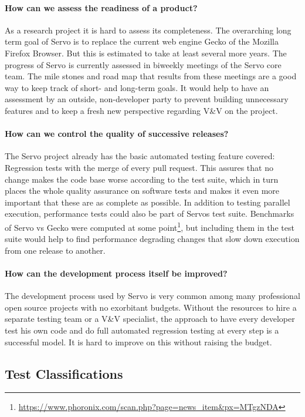 \documentclass{scrartcl}
\begin{document}
\paragraph{How can we assess the readiness of a product?}
As a research project it is hard to assess its completeness. The overarching long term goal of Servo is to replace the current web engine Gecko of the Mozilla Firefox Browser. But this is estimated to take at least several more years. The progress of Servo is currently assessed in biweekly meetings of the Servo core team. The mile stones and road map that results from these meetings are a good way to keep track of short- and long-term goals. It would help to have an assessment by an outside, non-developer party to prevent building unnecessary features and to keep a fresh new perspective regarding V\&V on the project.

\paragraph{How can we control the quality of successive releases?}
The Servo project already has the basic automated testing feature covered: Regression tests with the merge of every pull request. This assures that no change makes the code base worse according to the test suite, which in turn places the whole quality assurance on software tests and makes it even more important that these are as complete as possible. In addition to testing parallel execution, performance tests could also be part of Servos test suite. Benchmarks of Servo vs Gecko were computed at some point\footnote{\url{https://www.phoronix.com/scan.php?page=news_item&px=MTgzNDA}}, but including them in the test suite would help to find performance degrading changes that slow down execution from one release to another.

\paragraph{How can the development process itself be improved?}
The development process used by Servo is very common among many professional open source projects with no exorbitant budgets. Without the resources to hire a separate testing team or a V\&V specialist, the approach to have every developer test his own code and do full automated regression testing at every step is a successful model. It is hard to improve on this without raising the budget.


\subsection{Test Classifications}
\end{document}
